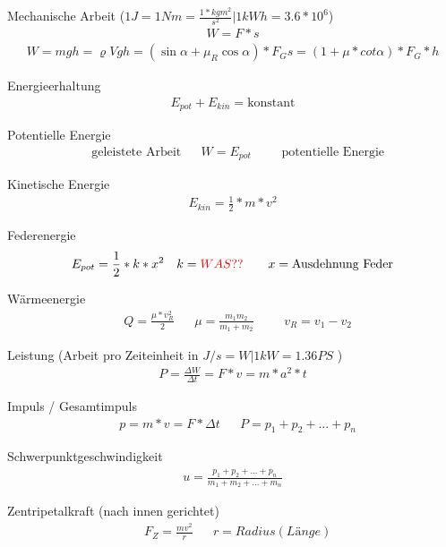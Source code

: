 \documentclass[17pt]{extarticle}
\begin{document}
	Mechanische Arbeit \small{($1J = 1Nm = \frac{1*kg m^{2}}{s^{2}} | 1 kWh = 3.6 * 10^6$)}
	\begin{align}
		W = F * s
	\end{align}
	\begin{align}
		W = m g h = \varrho V g h = (\sin \alpha + \mu_R \cos \alpha) * F_G s = (1 + \mu * cot \alpha) * F_G * h
	\end{align}

	Energieerhaltung
	\begin{align}
		E_{pot} + E_{kin} = \text{konstant}
	\end{align}
	
	Potentielle Energie
	\begin{align}
		&\text{geleistete Arbeit} 
		&&W = E_{pot} 
		&&&\text{potentielle Energie}
	\end{align}
	
	Kinetische Energie
	\begin{align}
		E_{kin} = \frac{1}{2} * m * v^{2}
	\end{align}
	
	Federenergie
	\begin{align}
		&E_{pot} = \frac{1}{2} * k * x^{2}
		&&k = \textcolor{red}{WAS??}
		&&&x = \text{Ausdehnung Feder}
	\end{align}
	
	Wärmeenergie
	\begin{align}
		&Q = \frac{\mu * v_R^2}{2}
		&&\mu = \frac{m_1 m_2}{m_1 + m_2}
		&&&v_R = v_1 - v_2
	\end{align}
	
	Leistung \small(Arbeit pro Zeiteinheit in $J/s = W | 1kW = 1.36 PS$ )
	\begin{align}
		P = \frac{\Delta W}{\Delta t} = F * v = m * a^{2} * t
	\end{align}
	
	Impuls / Gesamtimpuls
	\begin{align}
		&p = m * v = F * \Delta t
		&&P = p_{1} + p_{2} + ... + p_{n}
	\end{align}
	
	Schwerpunktgeschwindigkeit
	\begin{align}
		u = \frac{p_{1} + p_{2} + ... + p_{n}}{m_{1} + m_{2} + ... + m_{n}}
	\end{align}
	
	Zentripetalkraft (nach innen gerichtet)
	\begin{align}
		&F_Z = \frac{m v^2}{r}
		&& r = Radius (Länge)
	\end{align}
	
\end{document}
